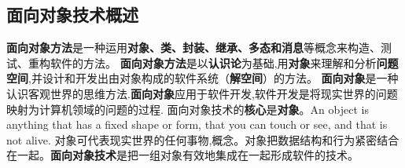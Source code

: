 \documentclass[../main.tex]{subfiles}
\begin{document}
\subsection{面向对象技术概述}
\textbf{面向对象方法}是一种运用\textbf{对象、类、封装、继承、多态和消息}等概念来构造、测试、重构软件的方法。
\textbf{面向对象方法}是以\textbf{认识论}为基础,用\textbf{对象}来理解和分析\textbf{问题空间},并设计和开发出由对象构成的软件系统（\textbf{解空间}）的方法。
\textbf{面向对象}是一种认识客观世界的思维方法.\textbf{面向对象}应用于软件开发,软件开发是将现实世界的问题映射为计算机领域的问题的过程.
面向对象技术的\textbf{核心}是\textbf{对象}。An object is anything that has a fixed shape or form, that you can touch or see, and that is not alive.
对象可代表现实世界的任何事物,概念。对象把数据结构和行为紧密结合在一起。\textbf{面向对象技术}是把一组对象有效地集成在一起形成软件的技术。
\end{document}
